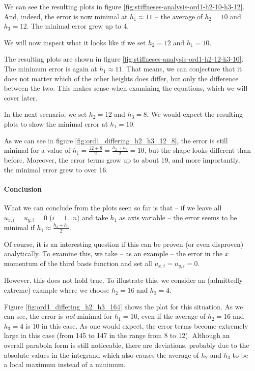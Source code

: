 \documentclass[a4paper, twoside]{article}
\begin{document}
We can see the resulting plots in figure \ref{fig:stiffneses-analysis-ord1-h2-10-h3-12}. And, indeed, the error is now minimal at $h_1\approx 11$ -- the average of $h_2=10$ and $h_3=12$. The minimal error grew up to 4.

We will now inspect what it looks like if we set $h_2=12$ and $h_1=10$.



The resulting plots are shown in figure \ref{fig:stiffneses-analysis-ord1-h2-12-h3-10}. The minimum error is again at $h_1\approx 11$. That means, we can conjecture that it does not matter which of the other heights does differ, but only the difference between the two. This makes sense when examining the equations, which we will cover later.

In the next scenario, we set $h_2=12$ and $h_3=8$. We would expect the resulting plots to show the minimal error at $h_1=10$.



As we can see in figure \ref{fig:ord1_differing_h2_h3_12_8}, the error is still minimal for a value of $h_1=\frac{12+8}{2}=\frac{h_2+h_3}{2}=10$, but the shape looks different than before. Moreover, the error terms grow up to about 19, and more importantly, the minimal error grew to over 16.

\paragraph{Conclusion}

What we can conclude from the plots seen so far is that -- if we leave all $u_{x,i}=u_{y,i}=0$ ($i=1\dots n$) and take $h_1$ as axis variable -- the error seems to be minimal if $h_1\approx \frac{h_2+h_3}{2}$.

Of course, it is an interesting question if this can be proven (or even disproven) analytically. To examine this, we take -- as an example -- the error in the $x$ momentum of the third basis function and set all $u_{x,i}=u_{y,i}=0$.

However, this does not hold true.
To illustrate this, we consider an (admittedly extreme) example where we choose $h_2=16$ and $h_3=4$.



Figure \ref{fig:ord1_differing_h2_h3_164} shows the plot for this situation. As we can see, the error is \emph{not} minimal for $h_1=10$, even if the average of $h_2=16$ and $h_3=4$ is 10 in this case. As one would expect, the error terms become extremely large in this case (from 145 to 147 in the range from 8 to 12). Although an overall parabola form is still noticeable, there are deviations, probably due to the absolute values in the integrand which also causes the average of $h_2$ and $h_3$ to be a local maximum instead of a minimum.
\end{document}
